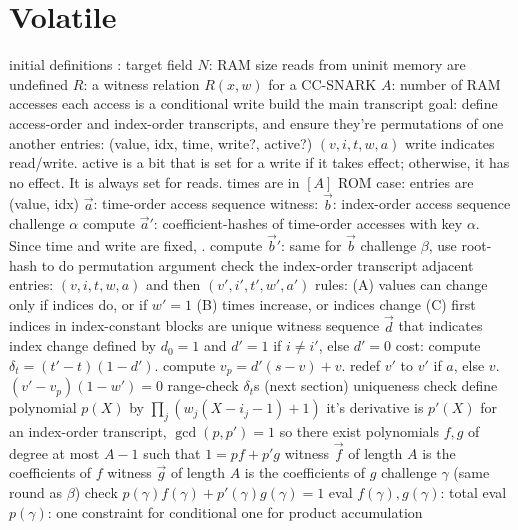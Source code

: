 \section{Volatile}
\begin{outline}
\1 initial definitions
  \2 \FF: target field
  \2 $N$: RAM size
  \2 reads from uninit memory are undefined
  \2 $R$: a witness relation $R(x, w)$ for a CC-SNARK
    \3 $A$: number of RAM accesses
      \4 each access is a conditional write
\1 build the main transcript
  \2 goal: define access-order and index-order transcripts, and ensure they're
  permutations of one another
  \2 entries: (value, idx, time, write?, active?) $(v, i, t, w, a)$
    \3 write indicates read/write.
    \3 active is a bit that is set for a write if it takes effect; otherwise, it has no effect. It is always set for reads.
    \3 times are in $[A]$
    \3 ROM case: entries are (value, idx)
  \2 $\vec a$: time-order access sequence
  \2 witness: $\vec b$: index-order access sequence
  \2 challenge $\alpha$
  \2 compute $\vec a'$: coefficient-hashes of time-order accesses with key
  $\alpha$.
    \3 Since time and write are fixed, .
  \2 compute $\vec b'$: same for $\vec b$
    \3 
  \2 challenge $\beta$, use root-hash to do permutation argument
    \3 
\1 check the index-order transcript
  \2 adjacent entries: $(v, i, t, w, a)$ and then $(v', i', t', w', a')$
  \2 rules:
    \3 (A) values can change only if indices do, or if $w'=1$
    \3 (B) times increase, or indices change
    \3 (C) first indices in index-constant blocks are unique
  \2 witness sequence $\vec d$ that indicates index change
    \3 defined by $d_0=1$ and $d'=1$ if $i \ne i'$, else $d'=0$
    \3 cost: 
  \2 compute $\delta_t = (t'-t)(1-d')$. 
  \2 compute $v_p = d'(s-v) + v$. 
  \2 redef $v'$ to $v'$ if $a$, else $v$. 
  \2 $(v'-v_p)(1-w')=0$ 
  \2 range-check $\delta_t$s (next section)
\1 uniqueness check
  \2 define polynomial $p(X)$ by $\prod_j (w_j(X - i_j - 1) + 1)$
  \2 it's derivative is $p'(X)$
  \2 for an index-order transcript, $\gcd(p,p')=1$
    \3 so there exist polynomials $f,g$ of degree at most $A-1$ such that $1 = pf + p'g$
  \2 witness $\vec f$ of length $A$ is the coefficients of $f$
  \2 witness $\vec g$ of length $A$ is the coefficients of $g$
  \2 challenge $\gamma$ (same round as $\beta$)
  \2 check $p(\gamma)f(\gamma) + p'(\gamma)g(\gamma)=1$
  \2 eval $f(\gamma), g(\gamma)$:  total
  \2 eval $p(\gamma)$: 
    \3 one constraint for conditional
    \3 one for product accumulation

\end{outline}

